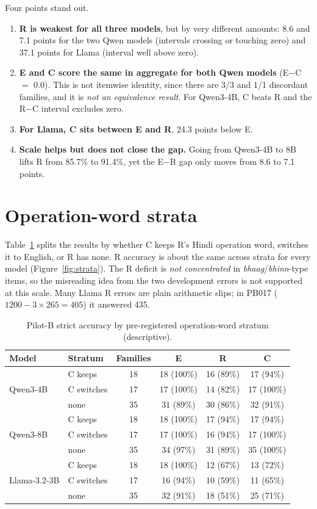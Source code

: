 \documentclass[12pt,a4paper,oneside]{report}
\renewcommand{\_}{\oldunderscore\allowbreak}
\begin{document}
Four points stand out.
\begin{enumerate}
\item \textbf{R is weakest for all three models}, but by very different amounts: 8.6 and 7.1 points for the two Qwen models (intervals crossing or touching zero) and 37.1 points for Llama (interval well above zero).
\item \textbf{E and C score the same in aggregate for both Qwen models} (E$-$C $=$ 0.0). This is not itemwise identity, since there are 3/3 and 1/1 discordant families, and it is \emph{not an equivalence result}. For Qwen3-4B, C beats R and the R$-$C interval excludes zero.
\item \textbf{For Llama, C sits between E and R}, 24.3 points below E.
\item \textbf{Scale helps but does not close the gap.} Going from Qwen3-4B to 8B lifts R from 85.7\% to 91.4\%, yet the E$-$R gap only moves from 8.6 to 7.1 points.
\end{enumerate}

\section{Operation-word strata}

Table~\ref{tab:strata} splits the results by whether C keeps R's Hindi operation word, switches it to English, or R has none. R accuracy is about the same across strata for every model (Figure~\ref{fig:strata}). The R deficit is \emph{not concentrated} in \emph{bhaag}/\emph{bhinn}-type items, so the misreading idea from the two development errors is not supported at this scale. Many Llama R errors are plain arithmetic slips; in PB017 ($1200 - 3\times265 = 405$) it answered 435.

\begin{table}[t]
\centering\small
\caption{Pilot-B strict accuracy by pre-registered operation-word stratum (descriptive).}
\label{tab:strata}
\begin{tabular}{@{}llcccc@{}}
\toprule
Model & Stratum & Families & E & R & C\\
\midrule
\multirow{3}{*}{Qwen3-4B} & C keeps & 18 & 18 (100\%) & 16 (89\%) & 17 (94\%)\\
 & C switches & 17 & 17 (100\%) & 14 (82\%) & 17 (100\%)\\
 & none & 35 & 31 (89\%) & 30 (86\%) & 32 (91\%)\\
\midrule
\multirow{3}{*}{Qwen3-8B} & C keeps & 18 & 18 (100\%) & 17 (94\%) & 17 (94\%)\\
 & C switches & 17 & 17 (100\%) & 16 (94\%) & 17 (100\%)\\
 & none & 35 & 34 (97\%) & 31 (89\%) & 35 (100\%)\\
\midrule
\multirow{3}{*}{Llama-3.2-3B} & C keeps & 18 & 18 (100\%) & 12 (67\%) & 13 (72\%)\\
 & C switches & 17 & 16 (94\%) & 10 (59\%) & 11 (65\%)\\
 & none & 35 & 32 (91\%) & 18 (51\%) & 25 (71\%)\\
\bottomrule
\end{tabular}
\end{table}
\end{document}

